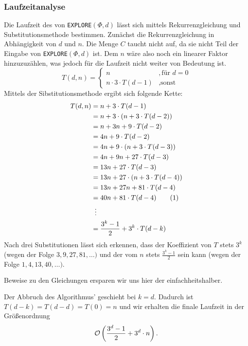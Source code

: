 \documentclass[a4paper]{article}
\newcommand{\explore}{\texttt{EXPLORE$(\Phi, d)$}\xspace}
\begin{document}
	\subsubsection*{Laufzeitanalyse}
	Die Laufzeit des von \explore lässt sich mittels Rekurrenzgleichung und Substitutionsmethode bestimmen.\n
	Zunächst die Rekurrenzgleichung in Abhängigkeit von $d$ und $n$.
	Die Menge $C$ taucht nicht auf, da sie nicht Teil der Eingabe von \explore ist. Dem $n$ wäre also noch ein linearer Faktor hinzuzuzählen, was jedoch für die Laufzeit nicht weiter von Bedeutung ist.
	\[
		T(d, n)=
		\begin{cases}
			n					& , \text{für } d=0\\
			n\cdot 3\cdot T(d-1)		& , \text{sonst}
		\end{cases}
	\]
	Mittels der Sibstitutionsmethode ergibt sich folgende Kette:
	\begin{align*}
		T(d, n)	&=		n+3		\cdot 						T(d-1)			\\
				&=		n+3		\cdot 	(	n+3		\cdot 	T(d-2))			\\
				&=		n+3			 		n+9		\cdot 	T(d-2)			\\
				&=	4 	n+9		\cdot 						T(d-2)			\\
				&=	4 	n+9		\cdot	(	n+3		\cdot 	T(d-3))			\\
				&=	4	n+9					n+27	\cdot	T(d-3)			\\
				&=	13	n+27	\cdot						T(d-3)			\\
				&=	13	n+27	\cdot	(	n+3		\cdot	T(d-4))			\\
				&=	13	n+27				n+81	\cdot	T(d-4)			\\
				&=	40	n+81	\cdot						T(d-4)	\tag{1}	\\
				&\makebox[\widthof{${}={}$}][c]{\vdots}					\\
				&=\frac{3^k-1}{2}+3^k\cdot T(d-k)
	\end{align*}
	Nach drei Substitutionen lässt sich erkennen, dass der Koeffizient von $T$ stets $3^k$ (wegen der Folge $3, 9, 27, 81, \dots)$ und der vom $n$ stets $\frac{3^k-1}{2}$ sein kann (wegen der Folge $1, 4, 13, 40, \dots)$.
	\begin{note}
	Beweise zu den Gleichungen ersparen wir uns hier der einfachheitshalber.
	\end{note}
	Der Abbruch des Algorithmus' geschieht bei $k=d$.
	Dadurch ist $T(d-k)=T(d-d)=T(0)=n$ und wir erhalten die finale Laufzeit in der Größenordnung
	\[
		\mathcal{O}\left(\frac{3^d-1}{2}+3^d\cdot n\right).
	\]
\end{document}
